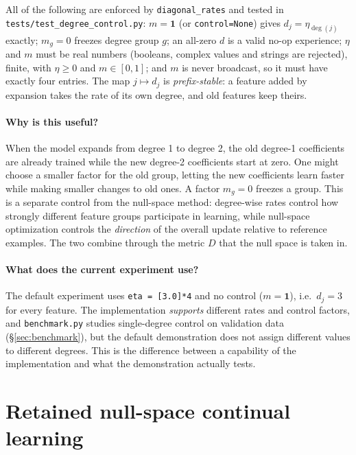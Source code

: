\documentclass[11pt,a4paper]{article}
\newcommand{\code}[1]{\texttt{#1}}
\begin{document}
All of the following are enforced by \code{diagonal\_rates} and tested in \code{tests/test\_degree\_control.py}: $m=\mathbf 1$ (or \code{control=None}) gives $d_j=\eta_{\deg(j)}$ exactly; $m_g=0$ freezes degree group $g$; an all-zero $d$ is a valid no-op experience; $\eta$ and $m$ must be real numbers (booleans, complex values and strings are rejected), finite, with $\eta\ge0$ and $m\in[0,1]$; and $m$ is never broadcast, so it must have exactly four entries. The map $j\mapsto d_j$ is \emph{prefix-stable}: a feature added by expansion takes the rate of its own degree, and old features keep theirs.

\subsection{Why is this useful?}

When the model expands from degree 1 to degree 2, the old degree-1 coefficients are already trained while the new degree-2 coefficients start at zero. One might choose a smaller factor for the old group, letting the new coefficients learn faster while making smaller changes to old ones. A factor $m_g=0$ freezes a group. This is a separate control from the null-space method: degree-wise rates control how strongly different feature groups participate in learning, while null-space optimization controls the \emph{direction} of the overall update relative to reference examples. The two combine through the metric $D$ that the null space is taken in.

\subsection{What does the current experiment use?}

The default experiment uses \code{eta = [3.0]*4} and no control ($m=\mathbf 1$), i.e.\ $d_j=3$ for every feature. The implementation \emph{supports} different rates and control factors, and \code{benchmark.py} studies single-degree control on validation data (\S\ref{sec:benchmark}), but the default demonstration does not assign different values to different degrees. This is the difference between a capability of the implementation and what the demonstration actually tests.

\part{Retained null-space continual learning}
\end{document}
